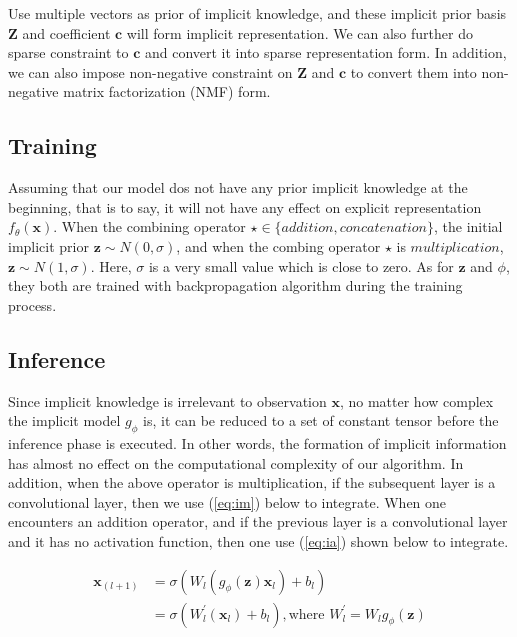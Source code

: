 \documentclass[10pt,twocolumn,letterpaper]{article}
\begin{document}
Use multiple vectors as prior of implicit knowledge, and these implicit prior basis $\mathbf{Z}$ and coefficient $\mathbf{c}$ will form implicit representation. We can also further do sparse constraint to $\mathbf{c}$ and convert it into sparse representation form. In addition, we can also impose non-negative constraint on $\mathbf{Z}$ and $\mathbf{c}$ to convert them into non-negative matrix factorization (NMF) form.

\newpage

\subsection{Training}

Assuming that our model dos not have any prior implicit knowledge at the beginning, that is to say, it will not have any effect on explicit representation $f_{\theta}(\mathbf{x})$. When the combining operator $\star \in \{addition, concatenation\}$, the initial implicit prior  $\mathbf{z} \sim N(0, \sigma)$, and when  the combing operator $\star$ is $multiplication$, $\mathbf{z} \sim N(1, \sigma)$. Here, $\sigma$ is a very small value which is close to zero. As for $\mathbf{z}$ and $\phi$, they both are trained with backpropagation algorithm during the training process.

\subsection{Inference}

Since implicit knowledge is irrelevant to observation $\mathbf{x}$, no matter how complex the implicit model $g_{\phi}$ is, it can be reduced to a set of constant tensor before the inference phase is executed. In other words, the formation of implicit information has almost no effect on the computational complexity of our algorithm. In addition, when the above operator is multiplication, if the subsequent layer is a convolutional layer, then we use (\ref{eq:im}) below to integrate. When one encounters an addition operator, and if the previous layer is a convolutional layer and it has no activation function, then one use (\ref{eq:ia}) shown below to integrate.

 \begin{equation}
 \begin{split}
 \mathbf{x}_{(l+1)} & = \sigma(W_{l}(g_{\phi}(\mathbf{z})\mathbf{x}_{l}) + b_{l}) \\
 & = \sigma(W_{l}^{'}(\mathbf{x}_{l}) + b_{l}), \text{where } W_{l}^{'} = W_{l}g_{\phi}(\mathbf{z})
 \end{split}
 \label{eq:im}
 \end{equation}
 
\end{document}
